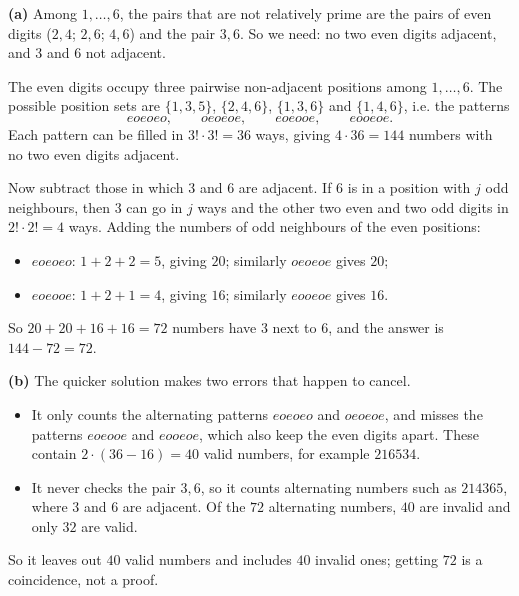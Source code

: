 \textbf{(a)} Among $1,\dots,6$, the pairs that are not relatively prime are the pairs of even digits ($2,4$; $2,6$; $4,6$) and the pair $3,6$. So we need: no two even digits adjacent, and $3$ and $6$ not adjacent.

The even digits occupy three pairwise non-adjacent positions among $1,\dots,6$. The possible position sets are $\{1,3,5\}$, $\{2,4,6\}$, $\{1,3,6\}$ and $\{1,4,6\}$, i.e. the patterns
\[eoeoeo,\qquad oeoeoe,\qquad eoeooe,\qquad eooeoe.\]
Each pattern can be filled in $3!\cdot3!=36$ ways, giving $4\cdot36=144$ numbers with no two even digits adjacent.

Now subtract those in which $3$ and $6$ are adjacent. If $6$ is in a position with $j$ odd neighbours, then $3$ can go in $j$ ways and the other two even and two odd digits in $2!\cdot2!=4$ ways. Adding the numbers of odd neighbours of the even positions:
\begin{itemize}
\item $eoeoeo$: $1+2+2=5$, giving $20$; similarly $oeoeoe$ gives $20$;
\item $eoeooe$: $1+2+1=4$, giving $16$; similarly $eooeoe$ gives $16$.
\end{itemize}
So $20+20+16+16=72$ numbers have $3$ next to $6$, and the answer is $144-72=\boxed{72}$.

\textbf{(b)} The quicker solution makes two errors that happen to cancel.
\begin{itemize}
\item It only counts the alternating patterns $eoeoeo$ and $oeoeoe$, and misses the patterns $eoeooe$ and $eooeoe$, which also keep the even digits apart. These contain $2\cdot(36-16)=40$ valid numbers, for example $216534$.
\item It never checks the pair $3,6$, so it counts alternating numbers such as $214365$, where $3$ and $6$ are adjacent. Of the $72$ alternating numbers, $40$ are invalid and only $32$ are valid.
\end{itemize}
So it leaves out $40$ valid numbers and includes $40$ invalid ones; getting $72$ is a coincidence, not a proof.
